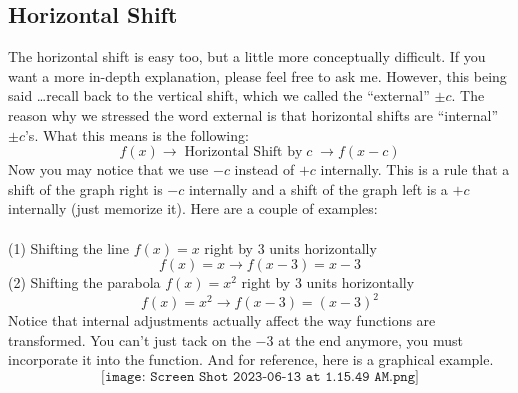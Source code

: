 \subsection{Horizontal Shift}
The horizontal shift is easy too, but a little more conceptually difficult. If you want a more in-depth explanation, please feel free to ask me. However, this being said \dots recall back to the vertical shift, which we called the ``external'' $\pm c$. The reason why we stressed the word external is that horizontal shifts are ``internal'' $\pm c$'s. What this means is the following:
$$
f(x) \longrightarrow\;\text{Horizontal Shift by}\;c\;\longrightarrow f(x-c)
$$
Now you may notice that we use $-c$ instead of $+c$ internally. This is a rule that a shift of the graph right is $-c$ internally and a shift of the graph left is a $+c$ internally (just memorize it). Here are a couple of examples:\\
\\
(1) Shifting the line $f(x) = x$ right by $3$ units horizontally
$$
f(x) = x \longrightarrow f(x-3) = x-3
$$
(2) Shifting the parabola $f(x) = x^2$ right by $3$ units horizontally
$$
f(x) = x^2 \longrightarrow f(x-3) = (x-3)^2
$$
Notice that internal adjustments actually affect the way functions are transformed. You can't just tack on the $-3$ at the end anymore, you must incorporate it into the function. And for reference, here is a graphical example.
$$
\texttt{[image: Screen Shot 2023-06-13 at 1.15.49 AM.png]}
$$
